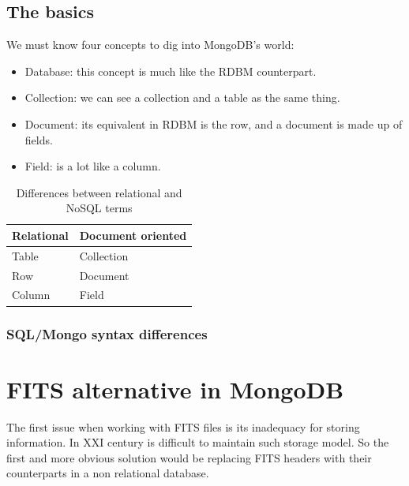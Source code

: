 \subsection{The basics}

We must know four concepts to dig into MongoDB's world:

\begin{itemize}
\item Database: this concept is much like the RDBM counterpart.
\item Collection: we can see a collection and a table as the same thing.
\item Document: its equivalent in RDBM is the row, and a document is made up of fields.
\item Field: is a lot like a column.
\end{itemize}


\begin{table}
\begin{center}
\begin{tabular}{|l|l|}
\hline
\textbf{Relational} & \textbf{Document oriented} \\ 
\hline
Table & Collection\\
\hline
Row & Document\\
\hline
Column & Field \\
\hline
\end{tabular}
\end{center}
\caption{Differences between relational and NoSQL terms}
\end{table}





\subsubsection{SQL/Mongo syntax differences}





\section{FITS alternative in MongoDB}

The first issue when working with FITS files is its inadequacy for storing information. In XXI century is difficult to maintain such storage model. So the first and more obvious solution would be replacing FITS headers with their counterparts in a non relational database. 

